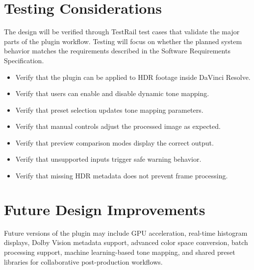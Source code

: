 \documentclass{article}
\begin{document}
\section{Testing Considerations}

The design will be verified through TestRail test cases that validate the major parts of the plugin workflow. Testing will focus on whether the planned system behavior matches the requirements described in the Software Requirements Specification.

\begin{itemize}
    \item Verify that the plugin can be applied to HDR footage inside DaVinci Resolve.
    \item Verify that users can enable and disable dynamic tone mapping.
    \item Verify that preset selection updates tone mapping parameters.
    \item Verify that manual controls adjust the processed image as expected.
    \item Verify that preview comparison modes display the correct output.
    \item Verify that unsupported inputs trigger safe warning behavior.
    \item Verify that missing HDR metadata does not prevent frame processing.
\end{itemize}

\section{Future Design Improvements}

Future versions of the plugin may include GPU acceleration, real-time histogram displays, Dolby Vision metadata support, advanced color space conversion, batch processing support, machine learning-based tone mapping, and shared preset libraries for collaborative post-production workflows.
\end{document}

